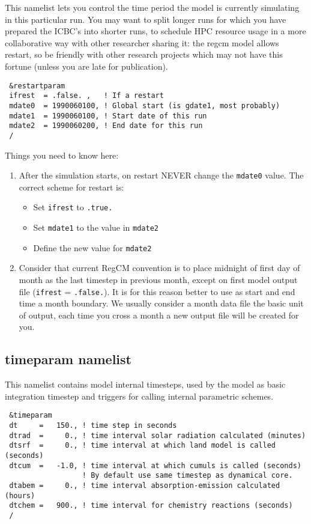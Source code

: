 This namelist lets you control the time period the model is currently simulating
in this particular run. You may want to split longer runs for which you have
prepared the ICBC's into shorter runs, to schedule HPC resource usage in a more
collaborative way with other researcher sharing it: the regcm model allows
restart, so be friendly with other research projects which may not have this
fortune (unless you are late for publication).

{\footnotesize
\begin{Verbatim}
 &restartparam
 ifrest  = .false. ,   ! If a restart
 mdate0  = 1990060100, ! Global start (is gdate1, most probably)
 mdate1  = 1990060100, ! Start date of this run
 mdate2  = 1990060200, ! End date for this run
 /
\end{Verbatim}
}

Things you need to know here:

\begin{enumerate}
\item After the simulation starts, on restart NEVER change the \verb=mdate0=
value. The correct scheme for restart is:
\begin{itemize}
\item Set \verb=ifrest= to \verb=.true.=
\item Set \verb=mdate1= to the value in \verb=mdate2=
\item Define the new value for \verb=mdate2=
\end{itemize}
\item Consider that current RegCM convention is to place midnight of first
day of month as the last timestep in previous month, except on first model
output file (\verb=ifrest= = \verb=.false.=). It is for this reason better
to use as start and end time a month boundary. We usually consider a month
data file the basic unit of output, each time you cross a month a new output
file will be created for you.
\end{enumerate}

\subsection{timeparam namelist}

This namelist contains model internal timesteps, used by the model as basic
integration timestep and triggers for calling internal parametric schemes.

{\footnotesize
\begin{Verbatim}
 &timeparam
 dt     =   150., ! time step in seconds
 dtrad  =     0., ! time interval solar radiation calculated (minutes)
 dtsrf  =     0., ! time interval at which land model is called (seconds)
 dtcum  =   -1.0, ! time interval at which cumuls is called (seconds)
                  ! By default use same timestep as dynamical core.
 dtabem =     0., ! time interval absorption-emission calculated (hours)
 dtchem =   900., ! time interval for chemistry reactions (seconds)
 /
\end{Verbatim}
}

